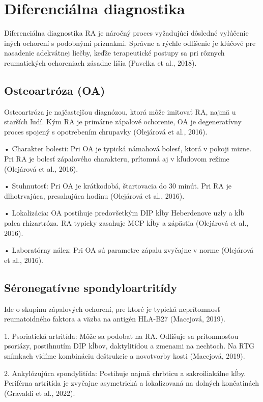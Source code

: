 \section{Diferenciálna diagnostika}

Diferenciálna diagnostika RA je náročný proces vyžadujúci dôsledné vylúčenie iných ochorení s podobnými príznakmi. Správne a rýchle odlíšenie je kľúčové pre nasadenie adekvátnej liečby, keďže terapeutické postupy sa pri rôznych reumatických ochoreniach zásadne líšia (Pavelka et al., 2018). 

\subsection{Osteoartróza (OA)}

Osteoartróza je najčastejšou diagnózou, ktorá môže imitovať RA, najmä u starších ľudí. Kým RA je primárne zápalové ochorenie, OA je degeneratívny proces spojený s opotrebením chrupavky (Olejárová et al., 2016). 

• Charakter bolesti: Pri OA je typická námahová bolesť, ktorá v pokoji mizne. Pri RA je bolesť zápalového charakteru, prítomná aj v kľudovom režime (Olejárová et al., 2016). 

• Stuhnutosť: Pri OA je krátkodobá, štartovacia do 30 minút. Pri RA je dlhotrvajúca, presahujúca hodinu (Olejárová et al., 2016). 

• Lokalizácia: OA postihuje predovšetkým DIP kĺby Heberdenove uzly a kĺb palca rhizartróza. RA typicky zasahuje MCP kĺby a zápästia (Olejárová et al., 2016). 

• Laboratórny nález: Pri OA sú parametre zápalu zvyčajne v norme (Olejárová et al., 2016). 

\subsection{Séronegatívne spondyloartritídy}

Ide o skupinu zápalových ochorení, pre ktoré je typická neprítomnosť reumatoidného faktora a väzba na antigén HLA-B27 (Macejová, 2019). 

1. Psoriatická artritída: Môže sa podobať na RA. Odlišuje sa prítomnosťou psoriázy, postihnutím DIP kĺbov, daktylitídou a zmenami na nechtoch. Na RTG snímkach vidíme kombináciu deštrukcie a novotvorby kosti (Macejová, 2019). 

2. Ankylózujúca spondylitída: Postihuje najmä chrbticu a sakroiliakálne kĺby. Periférna artritída je zvyčajne asymetrická a lokalizovaná na dolných končatinách (Gravaldi et al., 2022). 

